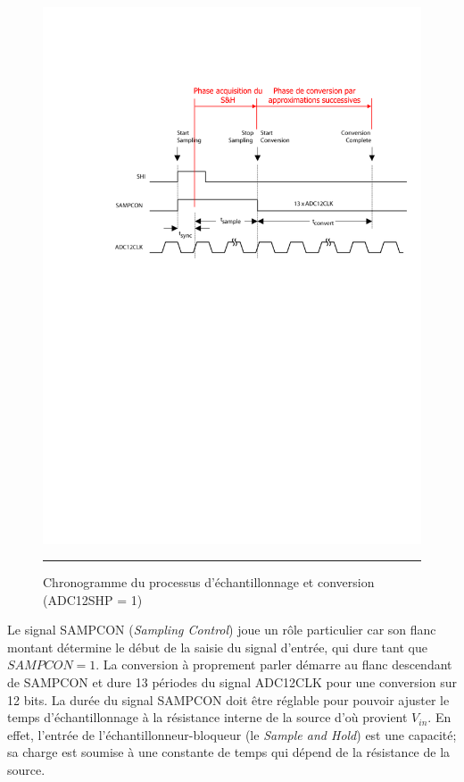 \begin{figure}[H]
  \centering
  \includegraphics [angle=0, width=14cm]{./Figures/Chap11_ADC/ADC12SHP1.pdf}
  \rule{35em}{0.5pt}
  \caption{Chronogramme du processus d'échantillonnage et conversion (ADC12SHP = 1)}
  \label{fig:ADC12SHP1}
\end{figure}

Le signal SAMPCON (\textit{Sampling Control}) joue un rôle particulier car son flanc montant détermine le début de la saisie du signal d'entrée, qui dure tant que $SAMPCON = 1$. La conversion à proprement parler démarre au flanc descendant de  SAMPCON et dure 13 périodes du signal ADC12CLK pour une conversion sur 12 bits.
La durée du signal SAMPCON doit être réglable pour pouvoir ajuster le temps d'échantillonnage à la résistance interne de la source d'où provient $V_{in}$. En effet, l'entrée de l'échantillonneur-bloqueur (le \textit{Sample and Hold}) est une capacité; sa charge est soumise à une constante de temps qui dépend de la résistance de la source.\\

